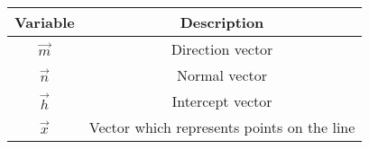 \begin{tabular}[12pt]{ |c|c|}
    \hline
    \textbf{Variable} & \textbf{Description}\\ 
    \hline
    $\vec{m}$ & Direction vector\\
    \hline
    $\vec{n}$ & Normal vector\\
    \hline
    $\vec{h}$ & Intercept vector\\
    \hline
    $\vec{x}$ & Vector which represents points on the line\\
    \hline
    \end{tabular}
